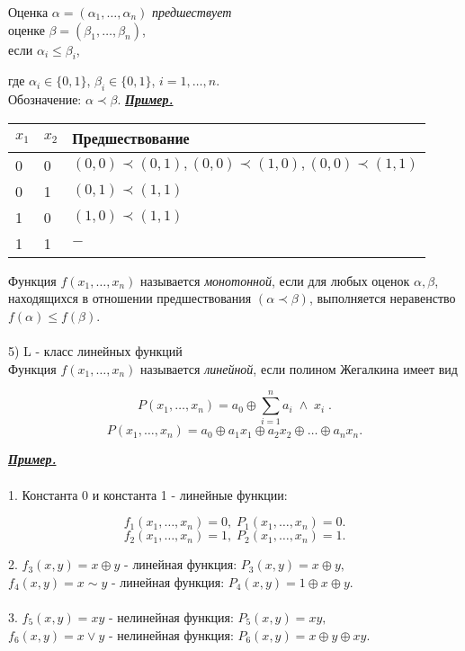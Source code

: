\documentclass{article}
\begin{document}
	\begin{center}
		Оценка $\alpha = ({\alpha}_1, \dots, {\alpha}_n)$ \textit{предшествует}\\
		оценке $\beta = ({\beta}_1, \dots, {\beta}_n)$,\\
		если ${\alpha}_i \leq {\beta}_i$,
	\end{center}
	где ${\alpha}_i \in \{0, 1\}$, ${\beta}_i \in \{0, 1\}$, $i = 1, \dots, n$.\\
	Обозначение: $\alpha \prec \beta$.
	\newpage
	\textbf{\textit{\underline{Пример.}}}
	\begin{table}[ht]
		\centering
		\begin{tabular}{|l|l|l|}
			\hline
			$x_1$ & $x_2$ & Предшествование                                                  \\ \hline
			0     & 0     & $(0, 0)  \prec (0, 1), (0, 0) \prec (1, 0), (0, 0) \prec (1, 1)$ \\ \hline
			0     & 1     & $(0, 1) \prec (1, 1)$                                            \\ \hline
			1     & 0     & $(1, 0) \prec (1, 1)$                                            \\ \hline
			1     & 1     & $-$                                                          \\ \hline
		\end{tabular}
	\end{table}
	
	Функция $f(x_1, \dots, x_n)$ называется \textit{монотонной}, если для любых оценок $\alpha, \beta$,
	находящихся в отношении предшествования $(\alpha \prec \beta)$, выполняется неравенство
	$f(\alpha) \leq f(\beta)$.
	\\\\
	5) L - класс линейных функций\\
	
	Функция $f(x_1, \dots, x_n)$ называется \textit{линейной}, если полином Жегалкина имеет вид
	
	$$P(x_1, \dots, x_n) = a_0 \oplus \sum\limits_{i=1}^{n} a_i \; \wedge \; x_i \; .$$
	$$P(x_1, \dots, x_n) = a_0 \oplus a_1 x_1 \oplus a_2 x_2 \oplus \dots \oplus a_n x_n.$$
	
	\textbf{\textit{\underline{Пример.}}}\\\\
	1. Константа 0 и константа 1 - линейные функции:
	
	$$f_1 (x_1, \dots, x_n) = 0, \; P_1 (x_1, \dots, x_n) = 0.$$
	$$f_2 (x_1, \dots, x_n) = 1, \; P_2 (x_1, \dots, x_n) = 1.$$
	
	2. $f_3 (x, y) = x \oplus y$ - линейная функция: $P_3 (x, y) = x \oplus y,$\\
	$f_4 (x, y) = x \sim y$ - линейная функция: $P_4 (x, y) = 1 \oplus x \oplus y.$
	\\\\
	3. $f_5 (x, y) = xy$ - нелинейная функция: $P_5 (x, y) = xy,$\\
	$f_6 (x, y) = x \vee y$ - нелинейная функция: $P_6 (x, y) = x \oplus y \oplus xy.$
	
\end{document}
